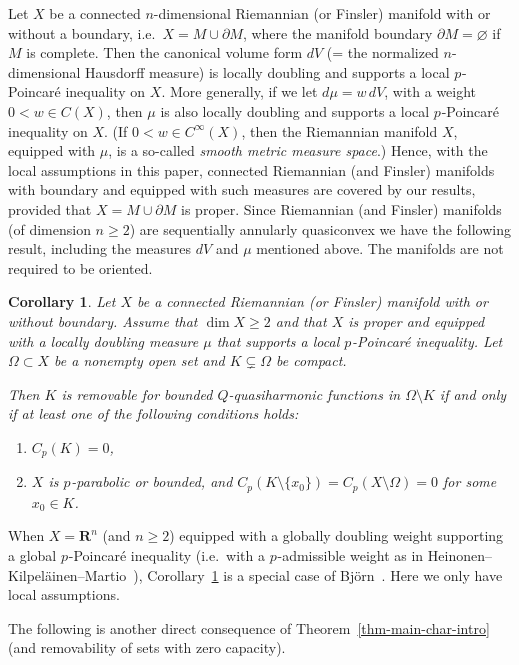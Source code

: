 \documentclass[a4paper,twoside]{article}
\theoremstyle{propositional}
\newtheorem{cor}[thm]{Corollary}
\theoremstyle{descriptive}
\theoremstyle{remarkstyle}
\newcommand{\setm}{\setminus}
\renewcommand{\subsetneq}{\varsubsetneq}
\renewcommand{\emptyset}{\varnothing}
\newcommand{\Cp}{{C_p}}
\newcommand{\bdry}{\partial}
\newcommand{\bdy}{\bdry}
\newcommand{\Om}{\Omega}
\newcommand{\p}{{$p\mspace{1mu}$}}
\newcommand{\Rn}{\mathbf{R}^n}
\numberwithin{equation}{section}
\begin{document}
Let $X$ be a connected $n$-dimensional Riemannian (or Finsler) manifold 
with or without a boundary,
i.e.\ $X=M \cup \bdy M$, where the manifold boundary
$\bdy M =\emptyset$ if $M$ is complete.
Then the canonical volume form $dV$ (= the normalized $n$-dimensional
Hausdorff measure) is locally doubling and 
supports a local \p-Poincar\'e inequality on $X$.
More generally, if we let $d\mu= w\,dV$, with a 
weight $0< w \in C(X)$, then $\mu$ is also 
locally doubling and 
supports a local \p-Poincar\'e inequality on $X$.
(If $0<w \in C^\infty(X)$, then the Riemannian manifold $X$, 
equipped with $\mu$,
is a so-called \emph{smooth metric measure space}.)
Hence, with the local assumptions in this paper, 
connected Riemannian (and Finsler) manifolds with  boundary and
equipped with
such measures are covered by our results,
provided that $X=M \cup \bdy M$ is proper.
Since Riemannian (and Finsler) manifolds (of dimension $n \ge 2$)
are sequentially
annularly quasiconvex we have the following result,
including the measures $dV$ and $\mu$ mentioned above.
The manifolds are not required to be oriented.


\begin{cor} \label{cor-mfld}
Let $X$ be a connected Riemannian\/ \textup(or Finsler\/\textup)
manifold with or without
boundary.  
Assume that $\dim X \ge 2$ and that $X$
is proper and
equipped with a locally doubling measure $\mu$ that
supports a local \p-Poincar\'e inequality.
Let $\Om \subset X$ be a nonempty open set and $K \subsetneq \Om$ be compact.

Then $K$ is removable for bounded $Q$-quasiharmonic functions in $\Om \setm K$
if and only if  at least one of the following conditions holds\/\textup:
\begin{enumerate}
\item $\Cp(K)=0$,
\item $X$ is \p-parabolic or bounded, and
$\Cp(K \setm \{x_0\})=\Cp(X\setm \Om)=0$ for some $x_0 \in K$.
\end{enumerate}
\end{cor}

When $X=\Rn$ (and $n \ge 2$) equipped with a globally doubling weight supporting
a global \p-Poincar\'e inequality (i.e.\ with a \p-admissible weight
as in Heinonen--Kilpel\"ainen--Martio~\cite{HeKiMa}), 
Corollary~\ref{cor-mfld}
is a special case of Bj\"orn~\cite[Theorem~1.3]{ABRnremove}. 
Here we only have local assumptions.



The following is another direct consequence of 
Theorem~\ref{thm-main-char-intro} (and removability of
sets with zero capacity).
\end{document}
